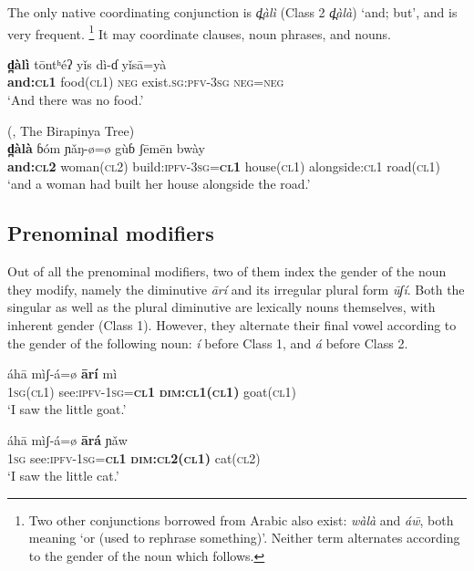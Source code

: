 \documentclass[output=collectionpaper,hidelinks]{langscibook}
\theoremstyle{remark}
\begin{document}
The only native coordinating conjunction is \emph{d̪àlì} (Class 2
\emph{d̪àlà}) `and; but', and is very frequent.%
\footnote{Two other conjunctions borrowed from Arabic also exist: \emph{wàlà}
and \emph{áw̄}, both meaning `or (used to rephrase something)'.  Neither term
alternates according to the gender of the noun which follows.} %
It may coordinate clauses, noun phrases, and nouns.

\ea
\gll  \textbf{d̪àlì} tōntʰéʔ yǐs\aMidLow{} dì-ɗ yǐsā=yà \\
 \textbf{and:\textsc{cl1}} food(\textsc{cl1}) \textsc{neg} exist.\textsc{sg}:\textsc{pfv}-\textsc{3sg} \textsc{neg}=\textsc{neg} \\
\glt `And there was no food.' \\
\z

\ea
(\citealt{James1979}, The Birapinya Tree)\\
\gll  \textbf{d̪àlà} ɓóm ɲǎŋ-ø=ø gùɓ ʃēmēn bwày \\
 \textbf{and:\textsc{cl2}} woman(\textsc{cl2}) build:\textsc{ipfv}-\textsc{3sg}=\textbf{\textsc{cl1}} house(\textsc{cl1}) alongside:\textsc{cl1} road(\textsc{cl1}) \\
\glt `and a woman had built her house alongside the road.' \\
\z


\subsection{Prenominal modifiers}
\label{sec:Don:Prenominal_modifiers}

Out of all the prenominal modifiers, two of them index the gender of the noun
they modify, namely the diminutive \emph{ārí} and its irregular plural form
\emph{ūʃí}.  Both the singular as well as the plural diminutive are lexically
nouns themselves, with inherent gender (Class 1).  However, they alternate their
final vowel according to the gender of the following noun: \emph{í} before Class
1, and \emph{á} before Class 2.

\ea
\gll  áhā mìʃ-á=ø \textbf{ārí} mì \\
 \textsc{1sg}(\textsc{cl1}) see:\textsc{ipfv}-\textsc{1sg}=\textbf{\textsc{cl1}} \textbf{\textsc{dim:cl1}(\textsc{cl1})} goat(\textsc{cl1}) \\
\glt `I saw the little goat.' \\
\z

\ea
\gll  áhā mìʃ-á=ø \textbf{ārá} ɲǎw \\
 \textsc{1sg} see:\textsc{ipfv}-\textsc{1sg}=\textbf{\textsc{cl1}} \textbf{\textsc{dim:cl2}(\textsc{cl1})} cat(\textsc{cl2}) \\
\glt `I saw the little cat.' \\
\z
\end{document}
